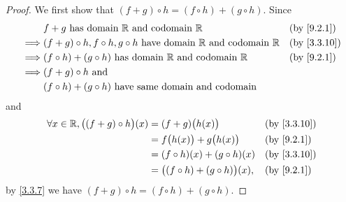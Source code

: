 \begin{proof}
  We first show that \((f + g) \circ h = (f \circ h) + (g \circ h)\).
  Since
  \begin{align*}
             & f + g \text{ has domain } \R \text{ and codomain } \R                                   &  & \by{9.2.1}  \\
    \implies & (f + g) \circ h, f \circ h, g \circ h  \text{ have domain } \R \text{ and codomain } \R &  & \by{3.3.10} \\
    \implies & (f \circ h) + (g \circ h)  \text{ has domain } \R \text{ and codomain } \R              &  & \by{9.2.1}  \\
    \implies & (f + g) \circ h \text{ and }                                                                             \\
             & (f \circ h) + (g \circ h) \text{ have same domain and codomain}
  \end{align*}
  and
  \begin{align*}
    \forall x \in \R, \big((f + g) \circ h\big)(x) & = (f + g)\big(h(x)\big)                   &  & \by{3.3.10} \\
                                                   & = f\big(h(x)\big) + g\big(h(x)\big)       &  & \by{9.2.1}  \\
                                                   & = (f \circ h)(x) + (g \circ h)(x)         &  & \by{3.3.10} \\
                                                   & = \big((f \circ h) + (g \circ h)\big)(x), &  & \by{9.2.1}
  \end{align*}
  by \cref{3.3.7} we have \((f + g) \circ h = (f \circ h) + (g \circ h)\).


\end{proof}
